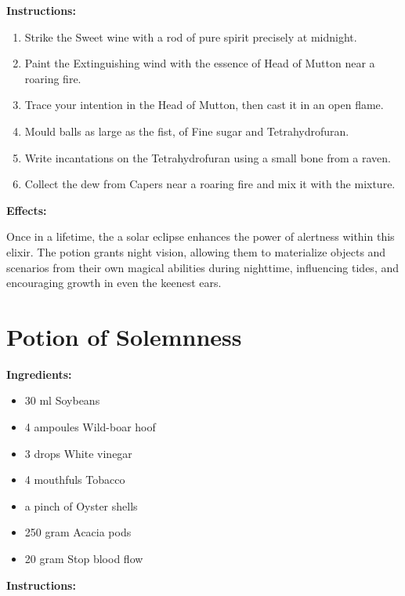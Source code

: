 \documentclass{article}
\begin{document}
\textbf{Instructions:}

\begin{enumerate}
  \item Strike the Sweet wine with a rod of pure spirit precisely at midnight.
  \item Paint the Extinguishing wind with the essence of Head of Mutton near a roaring fire.
  \item Trace your intention in the Head of Mutton, then cast it in an open flame.
  \item Mould balls as large as the fist, of Fine sugar and Tetrahydrofuran.
  \item Write incantations on the Tetrahydrofuran using a small bone from a raven.
  \item Collect the dew from Capers near a roaring fire and mix it with the mixture.
\end{enumerate}

\textbf{Effects:}

Once in a lifetime, the a solar eclipse enhances the power of alertness within this elixir. The potion grants night vision, allowing them to materialize objects and scenarios from their own magical abilities during nighttime, influencing tides, and encouraging growth in even the keenest ears.

\newpage
\section*{Potion of Solemnness}

\textbf{Ingredients:}

\begin{itemize}
  \item 30 ml Soybeans
  \item 4 ampoules Wild-boar hoof
  \item 3 drops White vinegar
  \item 4 mouthfuls Tobacco
  \item a pinch of Oyster shells
  \item 250 gram Acacia pods
  \item 20 gram Stop blood flow
\end{itemize}

\textbf{Instructions:}
\end{document}
